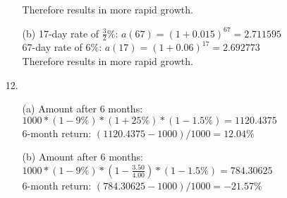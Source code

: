 \documentclass{article}
\begin{document}
\begin{itemize}
\begin{itemize}
                    Therefore  results in more rapid growth.
              \item [(b)]
                    17-day rate of $\frac{3}{2}\%$: $a(67)=(1+0.015)^{67}=2.711595$\\
                    67-day rate of $6\%$: $a(17)=(1+0.06)^{17}=2.692773$\\
                    Therefore  results in more rapid growth.
          \end{itemize}
    \item [12.]
          \begin{itemize}
              \item [(a)]
                    Amount after 6 months: $1000*(1-9\%)*(1+25\%)*(1-1.5\%)=1120.4375$\\
                    6-month return: $(1120.4375-1000)/1000=\boxed{12.04\%}$
              \item [(b)]
                    Amount after 6 months: $1000*(1-9\%)*(1-\frac{3.50}{4.00})*(1-1.5\%)=784.30625$\\
                    6-month return: $(784.30625-1000)/1000=\boxed{-21.57\%}$
          \end{itemize}
\end{itemize}
\end{document}
